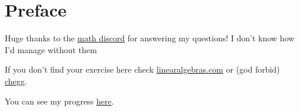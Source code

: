 \documentclass[titlepage,12pt]{book}
\begin{document}
\maketitle
\frontmatter

\chapter*{Preface}
Huge thanks to the \href{https://discord.com/invite/math}{math discord} for answering my questions! I don't know how I'd manage without them \heart
\par

If you don't find your exercise here check \href{https://linearalgebras.com/solution-understanding-analysis.html}{linearalgebras.com} or (god forbid) \href{https://www.chegg.com/homework-help/understanding-analysis-2nd-edition-solutions-9781493927111}{chegg}.
\par
You can see my progress \href{https://www.beeminder.com/valvate/abbott-tex-exercises}{here}.

\tableofcontents
\mainmatter




\end{document}

